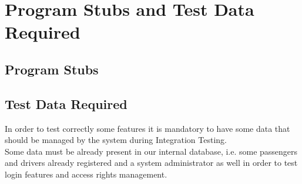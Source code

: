 \newpage
\section{Program Stubs and Test Data Required}
\subsection{Program Stubs}


\subsection{Test Data Required}
In order to test correctly some features it is mandatory to have some data that should be managed by the system during Integration Testing. \\
Some data must be already present in our internal database, i.e. some passengers and drivers already registered and a system administrator as well in order to test login features and access rights management.

